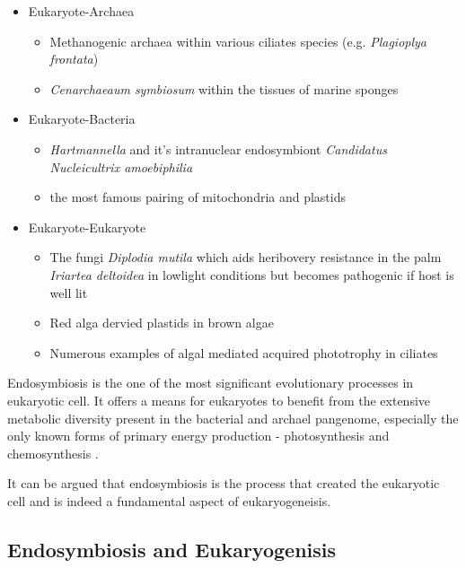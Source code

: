 \begin{itemize}
    \item Eukaryote-Archaea \citep{Moissl-Eichinger2011}
    \begin{itemize}
        \item Methanogenic archaea within various ciliates species (e.g. \textit{Plagioplya frontata}) \citep{Fenchel1992,Lange2005}
        \item \textit{Cenarchaeaum symbiosum} within the tissues of marine sponges \citep{Preston1996,Wrede2012}
    \end{itemize}
        \item Eukaryote-Bacteria 
    \begin{itemize}
         \item \textit{Hartmannella} and it's intranuclear endosymbiont \textit{Candidatus Nucleicultrix amoebiphilia} \citep{Schulz2014}
         \item the most famous pairing of mitochondria and plastids
    \end{itemize}
    \item Eukaryote-Eukaryote
    \begin{itemize}
        \item The fungi \textit{Diplodia mutila} which aids heribovery resistance in the palm \textit{Iriartea deltoidea} in lowlight
            conditions but becomes pathogenic if host is well lit \citep{Alvarez-Loayza2011}
        \item Red alga dervied plastids in brown algae \citep{Dorrell2011}
        \item Numerous examples of algal mediated acquired phototrophy in ciliates \citep{Johnson2011}
    \end{itemize}
\end{itemize}

Endosymbiosis is the one of the most significant evolutionary processes in eukaryotic cell.
It offers a means for eukaryotes to benefit from the extensive metabolic diversity
present in the bacterial and archael pangenome, especially the only known forms of primary energy
production - photosynthesis and chemosynthesis \citep{Wernegreen2012}.

It can be argued that endosymbiosis is the process that created the eukaryotic cell and is indeed a fundamental
aspect of eukaryogeneisis.

\subsection{Endosymbiosis and Eukaryogenisis}


